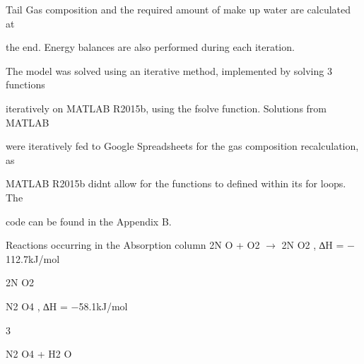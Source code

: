 \documentclass[a4paper,portrait,12pt]{article}
\begin{document}
\begin{flushleft}
Tail Gas composition and the required amount of make up water are calculated at
\end{flushleft}


\begin{flushleft}
the end. Energy balances are also performed during each iteration.
\end{flushleft}





\begin{flushleft}
The model was solved using an iterative method, implemented by solving 3 functions
\end{flushleft}


\begin{flushleft}
iteratively on MATLAB R2015b, using the fsolve function. Solutions from MATLAB
\end{flushleft}


\begin{flushleft}
were iteratively fed to Google Spreadsheets for the gas composition recalculation, as
\end{flushleft}


\begin{flushleft}
MATLAB R2015b didnt allow for the functions to defined within its for loops. The
\end{flushleft}


\begin{flushleft}
code can be found in the Appendix B.
\end{flushleft}


\begin{flushleft}
Reactions occurring in the Absorption column 2N O + O2 $\rightarrow$ 2N O2 , ∆H = $-$112.7kJ/mol
\end{flushleft}


\begin{flushleft}
2N O2
\end{flushleft}





\begin{flushleft}
N2 O4 , ∆H = $-$58.1kJ/mol
\end{flushleft}





3


\begin{flushleft}
N2 O4 + H2 O
\end{flushleft}
\end{document}
